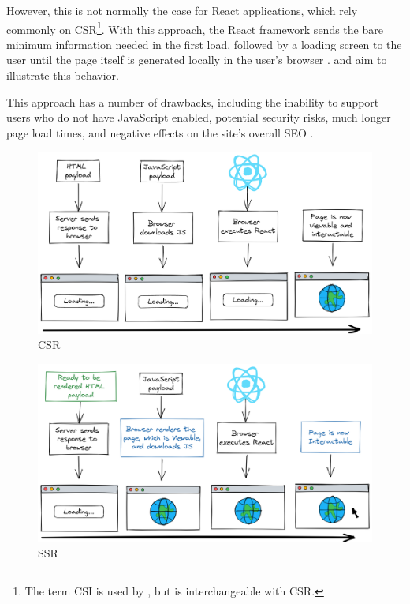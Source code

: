 \begin{description}
    However, this is not normally the case for React applications, which rely commonly on \ac{CSR}\footnote{The term \ac{CSI} is used by \textcite{DBLP:journals/corr/abs-0801-2618}, but is interchangeable with \acl{CSR}.}. With this approach, the React framework sends the bare minimum information needed in the first load, followed by a loading screen to the user until the page itself is generated locally in the user's browser \cite{DBLP:journals/corr/abs-0801-2618}.  and  aim to illustrate this behavior.

    This approach has a number of drawbacks, including the inability to support users who do not have JavaScript enabled, potential security risks, much longer page load times, and negative effects on the site's overall \ac{SEO} \cite{Thakkar2020}.

    \begin{figure}[!htb]
      \caption{\acl{CSR}}\label{fig:csr}
      \begin{center}
        \includegraphics[width=14cm]{img/6-csr.png}
      \end{center}
    \end{figure}

    \begin{figure}[!htb]
      \caption{\acl{SSR}}\label{fig:ssr}
      \begin{center}
        \includegraphics[width=14cm]{img/6-ssr.png}
      \end{center}
    \end{figure}


\end{description}
